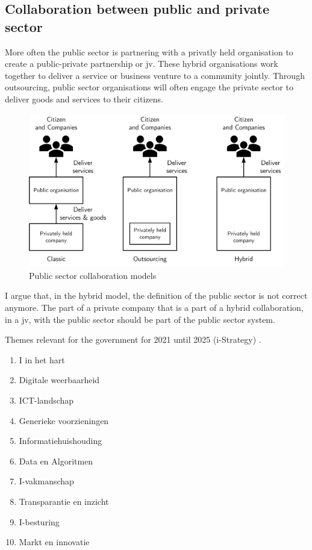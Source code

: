 \subsection{Collaboration between public and private sector}

More often the public sector is partnering with a privatly held organisation to create a public-private partnership or \acrfull{jv}. These hybrid organisations work together to deliver a service or business venture to a community jointly. Through outsourcing, public sector organisations will often engage the private sector to deliver goods and services to their citizens. 

\begin{figure}[H]
	\centering
	\includegraphics[width=0.7\linewidth]{images/publicsector3modelsofcolaboration}
	\caption[Public sector collaboration models]{Public sector collaboration models}
	\label{fig:publicsector3modelsofcolaboration}
\end{figure}

I argue that, in the hybrid model, the definition of the public sector is not correct anymore. The part of a private company that is a part of a hybrid collaboration, in a \gls{jv}, with the public sector should be part of the public sector system.

Themes relevant for the government for 2021 until 2025 (i-Strategy) \parencite{Digitaleoverheid2021}.

\begin{enumerate}
	\item{I in het hart}
	\item{Digitale weerbaarheid}
	\item{ICT-landschap}
	\item{Generieke voorzieningen}
	\item{Informatiehuishouding}
	\item{Data en Algoritmen}
	\item{I-vakmanschap}
	\item{Transparantie en inzicht}
	\item{I-besturing}
	\item{Markt en innovatie}
\end{enumerate}



